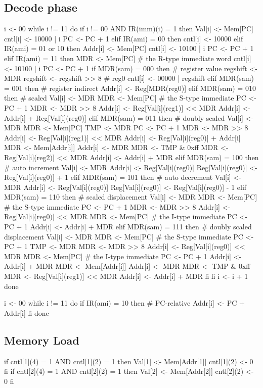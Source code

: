 \documentclass[12pt]{article}
\begin{document}
\subsection{Decode phase}
\begin{verbatimtab}
i <- 00
while i != 11 do
	if i != 00 AND IR(imm)(i) = 1 then
		Val[i] <- Mem[PC]
		cntl[i] <- 10000 | i
		PC <- PC + 1
	elif IR(ami) = 00 then
		cntl[i] <- 10000
	elif IR(ami) = 01 or 10 then
		Addr[i] <- Mem[PC]
		cntl[i] <- 10100 | i
		PC <- PC + 1
	elif IR(ami) = 11 then
		MDR <- Mem[PC] # the R-type immediate word
		cntl[i] <- 10100 | i
		PC <- PC + 1
		if MDR(sam) = 000 then # register value
			regshift <- MDR
			regshift <- regshift >> 8 # reg0
			cntl[i] <- 00000 | regshift
		elif MDR(sam) = 001 then # register indirect
			Addr[i] <- Reg[MDR(reg0)]
		elif MDR(sam) = 010 then # scaled
			Val[i] <- MDR
			MDR <- Mem[PC] # the S-type immediate
			PC <- PC + 1
			MDR <- MDR >> 8
			Addr[i] <- Reg[Val[i](reg1)] << MDR
			Addr[i] <- Addr[i] + Reg[Val[i](reg0)]
		elif MDR(sam) = 011 then # doubly scaled
			Val[i] <- MDR
			MDR <- Mem[PC]
			TMP <- MDR
			PC <- PC + 1
			MDR <- MDR >> 8
			Addr[i] <- Reg[Val[i](reg1)] << MDR
			Addr[i] <- Reg[Val[i](reg0)] + Addr[i]
			MDR <- Mem[Addr[i]]
			Addr[i] <- MDR
			MDR <- TMP & 0xff
			MDR <- Reg[Val[i](reg2)] << MDR
			Addr[i] <- Addr[i] + MDR
		elif MDR(sam) = 100 then # auto increment
			Val[i] <- MDR
			Addr[i] <- Reg[Val[i](reg0)]
			Reg[Val[i](reg0)] <- Reg[Val[i](reg0)] + 1
		elif MDR(sam) = 101 then # auto decrement
			Val[i] <- MDR
			Addr[i] <- Reg[Val[i](reg0)]
			Reg[Val[i](reg0)] <- Reg[Val[i](reg0)] - 1
		elif MDR(sam) = 110 then # scaled displacement
			Val[i] <- MDR
			MDR <- Mem[PC] # the S-type immediate
			PC <- PC + 1
			MDR <- MDR >> 8
			Addr[i] <- Reg[Val[i](reg0)] << MDR
			MDR <- Mem[PC] # the I-type immediate
			PC <- PC + 1
			Addr[i] <- Addr[i] + MDR
		elif MDR(sam) = 111 then # doubly scaled displacement
			Val[i] <- MDR
			MDR <- Mem[PC] # the S-type immediate
			PC <- PC + 1
			TMP <- MDR
			MDR <- MDR >> 8
			Addr[i] <- Reg[Val[i](reg0)] << MDR
			MDR <- Mem[PC] # the I-type immediate
			PC <- PC + 1
			Addr[i] <- Addr[i] + MDR
			MDR <- Mem[Addr[i]]
			Addr[i] <- MDR
			MDR <- TMP & 0xff
			MDR <- Reg[Val[i](reg1)] << MDR
			Addr[i] <- Addr[i] + MDR
		fi
	fi
	i <- i + 1
done

i <- 00
while i != 11 do
	if IR(ami) = 10 then # PC-relative
		Addr[i] <- PC + Addr[i]
	fi
done
\end{verbatimtab}

\subsection{Memory Load}
\begin{verbatimtab}
if cntl[1](4) = 1 AND cntl[1](2) = 1 then
	Val[1] <- Mem[Addr[1]]
	cntl[1](2) <- 0
fi
if cntl[2](4) = 1 AND cntl[2](2) = 1 then
	Val[2] <- Mem[Addr[2]]
	cntl[2](2) <- 0
fi
\end{verbatimtab}
\end{document}
